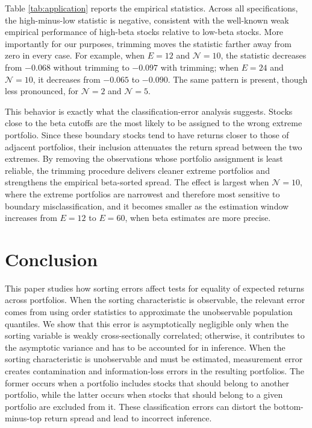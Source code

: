 Table \ref{tab:application} reports the empirical statistics. Across all specifications, the high-minus-low statistic is negative, consistent with the well-known weak empirical performance of high-beta stocks relative to low-beta stocks. More importantly for our purposes, trimming moves the statistic farther away from zero in every case. For example, when $E=12$ and $\mathcal{N}=10$, the statistic decreases from $-0.068$ without trimming to $-0.097$ with trimming; when $E=24$ and $\mathcal{N}=10$, it decreases from $-0.065$ to $-0.090$. The same pattern is present, though less pronounced, for $\mathcal{N}=2$ and $\mathcal{N}=5$.

 

This behavior is exactly what the classification-error analysis suggests. Stocks close to the beta cutoffs are the most likely to be assigned to the wrong extreme portfolio. Since these boundary stocks tend to have returns closer to those of adjacent portfolios, their inclusion attenuates the return spread between the two extremes. By removing the observations whose portfolio assignment is least reliable, the trimming procedure delivers cleaner extreme portfolios and strengthens the empirical beta-sorted spread. The effect is largest when $\mathcal{N}=10$, where the extreme portfolios are narrowest and therefore most sensitive to boundary misclassification, and it becomes smaller as the estimation window increases from $E=12$ to $E=60$, when beta estimates are more precise.


\section{Conclusion}
\label{Conclusion}

This paper studies how sorting errors affect tests for equality of expected returns across portfolios. When the sorting characteristic is observable, the relevant error comes from using order statistics to approximate the unobservable population quantiles. We show that this error is asymptotically negligible only when the sorting variable is weakly cross-sectionally correlated; otherwise, it contributes to the asymptotic variance and has to be accounted for in inference. When the sorting characteristic is unobservable and must be estimated, measurement error creates contamination and information-loss errors in the resulting portfolios. The former occurs when a portfolio includes stocks that should belong to another portfolio, while the latter occurs when stocks that should belong to a given portfolio are excluded from it. These classification errors can distort the bottom-minus-top return spread and lead to incorrect inference.

